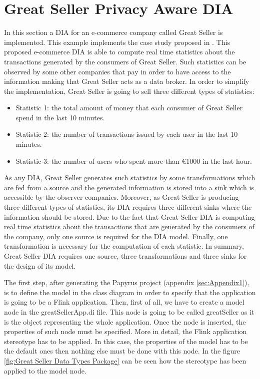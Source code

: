 \section{Great Seller Privacy Aware DIA}

In this section a DIA for an e-commerce company called Great Seller is implemented. This example implements the case study proposed in \cite{privacypoliciesarticle}. This proposed e-commerce DIA is able to compute real time statistics about the transactions generated by the consumers of Great Seller. Such statistics can be observed by some other companies that pay in order to have access to the information making that Great Seller acts as a data broker. In order to simplify the implementation, Great Seller is going to sell three different types of statistics:

\begin{itemize}

\item Statistic 1: the total amount of money that each consumer of Great Seller spend in the last 10 minutes.
\item Statistic 2: the number of transactions issued by each user in the last 10 minutes.
\item Statistic 3: the number of users who spent more than \euro{1000} in the last hour.

\end{itemize}

As any DIA, Great Seller generates such statistics by some transformations which are fed from a source and the generated information is stored into a sink which is accessible by the observer companies. Moreover, as Great Seller is producing three different types of statistics, its DIA requires three different sinks where the information should be stored. Due to the fact that Great Seller DIA is computing real time statistics about the transactions that are generated by the consumers of the company, only one source is required for the DIA model. Finally, one transformation is necessary for the computation of each statistic. In summary, Great Seller DIA requires one source, three transformations and three sinks for the design of its model.

The first step, after generating the Papyrus project (appendix \ref{sec:Appendix1}), is to define the model in the class diagram in order to specify that the application is going to be a Flink application. Then, first of all, we have to create a model node in the greatSellerApp.di file. This node is going to be called greatSeller as it is the object representing the whole application. Once the node is inserted, the properties of such node must be specified. More in detail, the Flink application stereotype has to be applied. In this case, the properties of the model has to be the default ones then nothing else must be done with this node. In the figure \ref{fig:Great Seller Data Types Package} can be seen how the stereotype has been applied to the model node.


